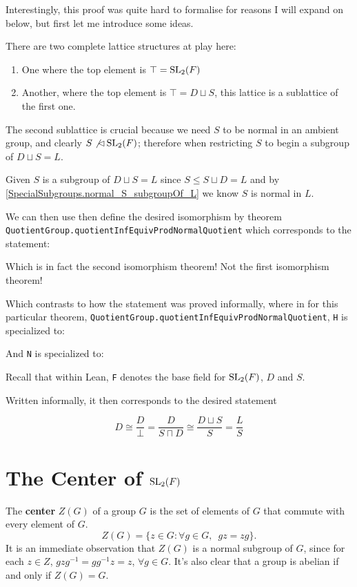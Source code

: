 \begin{remark}
Interestingly, this proof was quite hard to formalise for reasons I will expand on below, but first let me introduce some ideas.

There are two complete lattice structures at play here:
\begin{enumerate}
  \item One where the top element is $\top = \operatorname{SL}_2(F)$
  \item Another, where the top element is $\top = D \sqcup S$, this lattice is a sublattice of the first one.
\end{enumerate}  

The second sublattice is crucial because we need $S$ to be normal in an ambient group, and clearly $S \not\lhd \operatorname{SL}_2(F)$; therefore when restricting $S$ to begin a
subgroup of $D \sqcup S = L$. 

Given $S$ is a subgroup of $D \sqcup S = L$ since $S \le S\sqcup D = L$ and by \ref{SpecialSubgroups.normal_S_subgroupOf_L}
we know $S$ is normal in $L$.

We can then use then define the desired isomorphism by theorem
\texttt{QuotientGroup.quotientInfEquivProdNormalQuotient} which corresponds to the statement:



Which is in fact the second isomorphism theorem! Not the first isomorphism theorem! 

Which contrasts to how the statement was proved informally, where in for this particular theorem,
\texttt{QuotientGroup.quotientInfEquivProdNormalQuotient}, \texttt{H} is specialized to:




And \texttt{N} is specialized to:



Recall that within Lean, \texttt{F} denotes the base field for $\operatorname{SL}_2(F)$, $D$ and $S$.

Written informally, it then corresponds to the desired statement

\[
D \cong \frac{D}{\bot} = \frac{D}{S \sqcap D} \cong \frac{D \sqcup S}{S} = \frac{L}{S}
\]
\end{remark}

\section{The Center of $\operatorname{SL}_2(F)$}

\begin{definition}
The \textbf{center} $Z(G)$ of a group $G$ is the set of elements of  $G$ that commute with every element of $G$.
\begin {equation*} Z(G) = \{ z \in G : \forall g \in G, \hspace{6pt} gz=zg \}. \end{equation*}
It is an immediate observation that $Z(G)$ is a normal subgroup of $G$, 
since for each $z \in Z$, $gzg^{-1} = gg^{-1}z = z$, $\forall g \in G$. It's also clear that a group is abelian if and only if $Z(G)=G$.
\end{definition}

